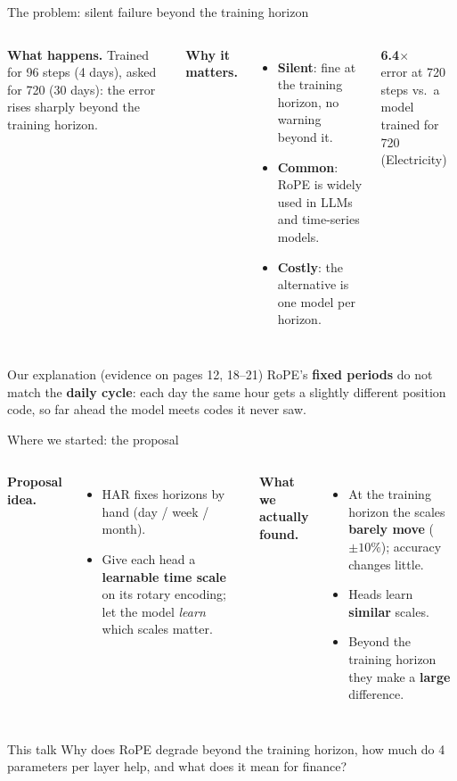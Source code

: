 \documentclass[aspectratio=169,xcolor=dvipsnames]{beamer}
\begin{document}
\begin{frame}{The problem: silent failure beyond the training horizon}
\begin{columns}[T]
\textbf{What happens.} Trained for 96 steps (4 days), asked for 720 (30 days): the error rises sharply beyond the training horizon.

\smallskip
\textbf{Why it matters.}
\begin{itemize}
\item \textbf{Silent}: fine at the training horizon, no warning beyond it.
\item \textbf{Common}: RoPE is widely used in LLMs and time-series models.
\item \textbf{Costly}: the alternative is one model per horizon.
\end{itemize}
\centering
{\fontsize{40}{44}\selectfont\bfseries\color{fixedc}6.4$\times$}\\[2pt]
{\scriptsize error at 720 steps vs.\ a model trained for 720 (Electricity)}
\end{columns}
\vspace{0.15cm}
\begin{block}{Our explanation (evidence on pages 12, 18--21)}
RoPE's \textbf{fixed periods} do not match the \textbf{daily cycle}: each day the same hour gets a slightly different position code, so far ahead the model meets codes it never saw.
\end{block}
\end{frame}

\begin{frame}{Where we started: the proposal}
\begin{columns}[T]
\textbf{Proposal idea.}
\begin{itemize}
\item HAR fixes horizons by hand (day / week / month).
\item Give each head a \textbf{learnable time scale} on its rotary encoding; let the model \emph{learn} which scales matter.
\end{itemize}
\textbf{What we actually found.}
\begin{itemize}
\item At the training horizon the scales \textbf{barely move} ($\pm10\%$); accuracy changes little.
\item Heads learn \textbf{similar} scales.
\item Beyond the training horizon they make a \textbf{large} difference.
\end{itemize}
\end{columns}
\vspace{0.3cm}
\begin{alertblock}{This talk}
Why does RoPE degrade beyond the training horizon, how much do 4 parameters per layer help, and what does it mean for finance?
\end{alertblock}
\end{frame}
\end{document}
